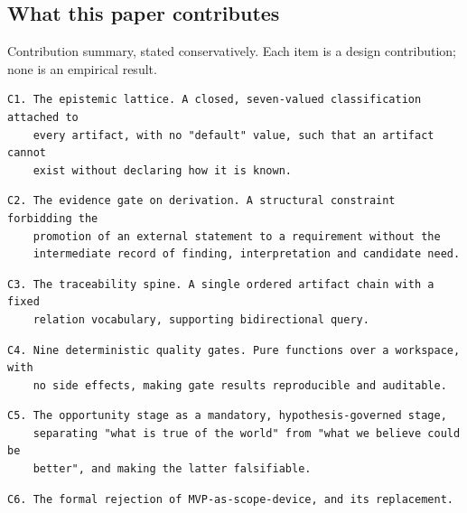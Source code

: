 \documentclass[11pt,a4paper]{article}
\begin{document}
\subsection{What this paper contributes}

Contribution summary, stated conservatively. Each item is a design contribution; none is an empirical result.

\begin{Verbatim}[fontsize=\footnotesize,breaklines=true,breakanywhere=true,breakautoindent=false,samepage=false]
C1. The epistemic lattice. A closed, seven-valued classification attached to
    every artifact, with no "default" value, such that an artifact cannot
    exist without declaring how it is known.
\end{Verbatim}

\begin{Verbatim}[fontsize=\footnotesize,breaklines=true,breakanywhere=true,breakautoindent=false,samepage=false]
C2. The evidence gate on derivation. A structural constraint forbidding the
    promotion of an external statement to a requirement without the
    intermediate record of finding, interpretation and candidate need.
\end{Verbatim}

\begin{Verbatim}[fontsize=\footnotesize,breaklines=true,breakanywhere=true,breakautoindent=false,samepage=false]
C3. The traceability spine. A single ordered artifact chain with a fixed
    relation vocabulary, supporting bidirectional query.
\end{Verbatim}

\begin{Verbatim}[fontsize=\footnotesize,breaklines=true,breakanywhere=true,breakautoindent=false,samepage=false]
C4. Nine deterministic quality gates. Pure functions over a workspace, with
    no side effects, making gate results reproducible and auditable.
\end{Verbatim}

\begin{Verbatim}[fontsize=\footnotesize,breaklines=true,breakanywhere=true,breakautoindent=false,samepage=false]
C5. The opportunity stage as a mandatory, hypothesis-governed stage,
    separating "what is true of the world" from "what we believe could be
    better", and making the latter falsifiable.
\end{Verbatim}

\begin{Verbatim}[fontsize=\footnotesize,breaklines=true,breakanywhere=true,breakautoindent=false,samepage=false]
C6. The formal rejection of MVP-as-scope-device, and its replacement.
\end{Verbatim}
\end{document}
